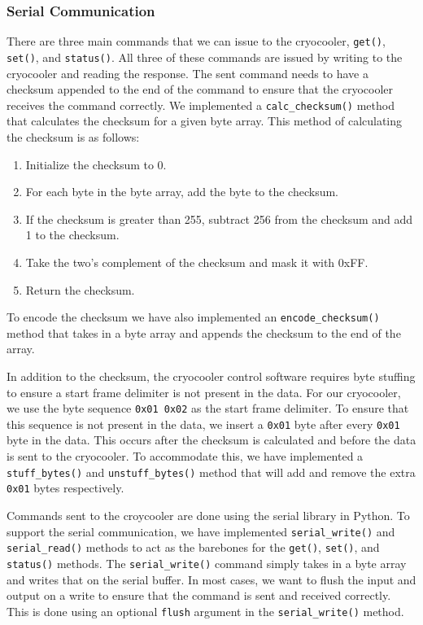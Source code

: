 \subsubsection{Serial Communication}
There are three main commands that we can issue to the cryocooler, \texttt{get()}, \texttt{set()}, and \texttt{status()}.
All three of these commands are issued by writing to the cryocooler and reading the response.
The sent command needs to have a checksum appended to the end of the command to ensure that the cryocooler receives the command correctly.
We implemented a \texttt{calc\_checksum()} method that calculates the checksum for a given byte array. 
This method of calculating the checksum is as follows:
\begin{enumerate}
    \item Initialize the checksum to 0.
    \item For each byte in the byte array, add the byte to the checksum.
    \item If the checksum is greater than 255, subtract 256 from the checksum and add 1 to the checksum.
    \item Take the two's complement of the checksum and mask it with 0xFF.
    \item Return the checksum.
\end{enumerate}
To encode the checksum we have also implemented an \texttt{encode\_checksum()} method that takes in a byte array and appends the checksum to the end of the array.

In addition to the checksum, the cryocooler control software requires byte stuffing to ensure a start frame delimiter is not present in the data.
For our cryocooler, we use the byte sequence \texttt{0x01 0x02} as the start frame delimiter.
To ensure that this sequence is not present in the data, we insert a \texttt{0x01} byte after every \texttt{0x01} byte in the data. 
This occurs after the checksum is calculated and before the data is sent to the cryocooler.
To accommodate this, we have implemented a \texttt{stuff\_bytes()} and \texttt{unstuff\_bytes()} method that will add and remove the extra \texttt{0x01} bytes respectively.

Commands sent to the croycooler are done using the serial library in Python.
To support the serial communication, we have implemented \texttt{serial\_write()} and \texttt{serial\_read()} methods to act as the barebones for the \texttt{get()}, \texttt{set()}, and \texttt{status()} methods.
The \texttt{serial\_write()} command simply takes in a byte array and writes that on the serial buffer.
In most cases, we want to flush the input and output on a write to ensure that the command is sent and received correctly.
This is done using an optional \texttt{flush} argument in the \texttt{serial\_write()} method.

